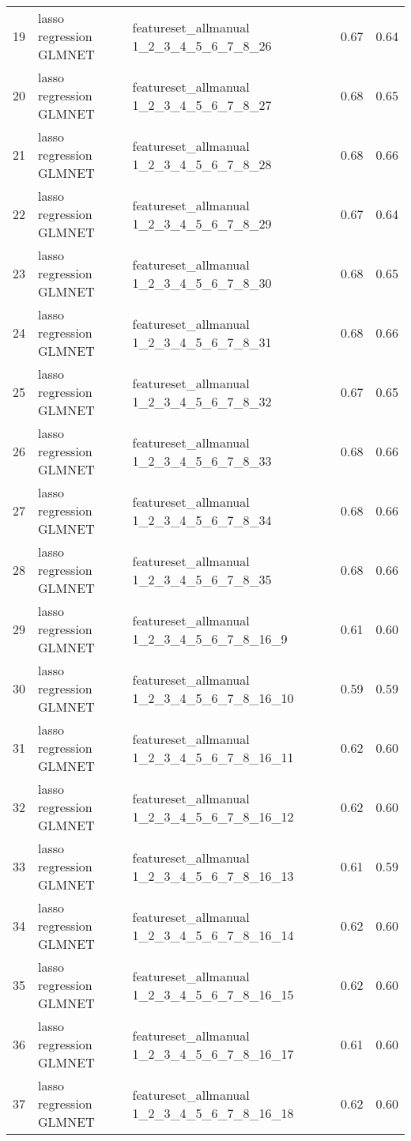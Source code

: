 \begin{tabular}{cllcc}
  19 & lasso regression GLMNET & featureset\_allmanual 1\_2\_3\_4\_5\_6\_7\_8\_26 & 0.67 & 0.64 \\ 
  20 & lasso regression GLMNET & featureset\_allmanual 1\_2\_3\_4\_5\_6\_7\_8\_27 & 0.68 & 0.65 \\ 
  21 & lasso regression GLMNET & featureset\_allmanual 1\_2\_3\_4\_5\_6\_7\_8\_28 & 0.68 & 0.66 \\ 
  22 & lasso regression GLMNET & featureset\_allmanual 1\_2\_3\_4\_5\_6\_7\_8\_29 & 0.67 & 0.64 \\ 
  23 & lasso regression GLMNET & featureset\_allmanual 1\_2\_3\_4\_5\_6\_7\_8\_30 & 0.68 & 0.65 \\ 
  24 & lasso regression GLMNET & featureset\_allmanual 1\_2\_3\_4\_5\_6\_7\_8\_31 & 0.68 & 0.66 \\ 
  25 & lasso regression GLMNET & featureset\_allmanual 1\_2\_3\_4\_5\_6\_7\_8\_32 & 0.67 & 0.65 \\ 
  26 & lasso regression GLMNET & featureset\_allmanual 1\_2\_3\_4\_5\_6\_7\_8\_33 & 0.68 & 0.66 \\ 
  27 & lasso regression GLMNET & featureset\_allmanual 1\_2\_3\_4\_5\_6\_7\_8\_34 & 0.68 & 0.66 \\ 
  28 & lasso regression GLMNET & featureset\_allmanual 1\_2\_3\_4\_5\_6\_7\_8\_35 & 0.68 & 0.66 \\ 
  29 & lasso regression GLMNET & featureset\_allmanual 1\_2\_3\_4\_5\_6\_7\_8\_16\_9 & 0.61 & 0.60 \\ 
  30 & lasso regression GLMNET & featureset\_allmanual 1\_2\_3\_4\_5\_6\_7\_8\_16\_10 & 0.59 & 0.59 \\ 
  31 & lasso regression GLMNET & featureset\_allmanual 1\_2\_3\_4\_5\_6\_7\_8\_16\_11 & 0.62 & 0.60 \\ 
  32 & lasso regression GLMNET & featureset\_allmanual 1\_2\_3\_4\_5\_6\_7\_8\_16\_12 & 0.62 & 0.60 \\ 
  33 & lasso regression GLMNET & featureset\_allmanual 1\_2\_3\_4\_5\_6\_7\_8\_16\_13 & 0.61 & 0.59 \\ 
  34 & lasso regression GLMNET & featureset\_allmanual 1\_2\_3\_4\_5\_6\_7\_8\_16\_14 & 0.62 & 0.60 \\ 
  35 & lasso regression GLMNET & featureset\_allmanual 1\_2\_3\_4\_5\_6\_7\_8\_16\_15 & 0.62 & 0.60 \\ 
  36 & lasso regression GLMNET & featureset\_allmanual 1\_2\_3\_4\_5\_6\_7\_8\_16\_17 & 0.61 & 0.60 \\ 
  37 & lasso regression GLMNET & featureset\_allmanual 1\_2\_3\_4\_5\_6\_7\_8\_16\_18 & 0.62 & 0.60 \\ 

\end{tabular}
